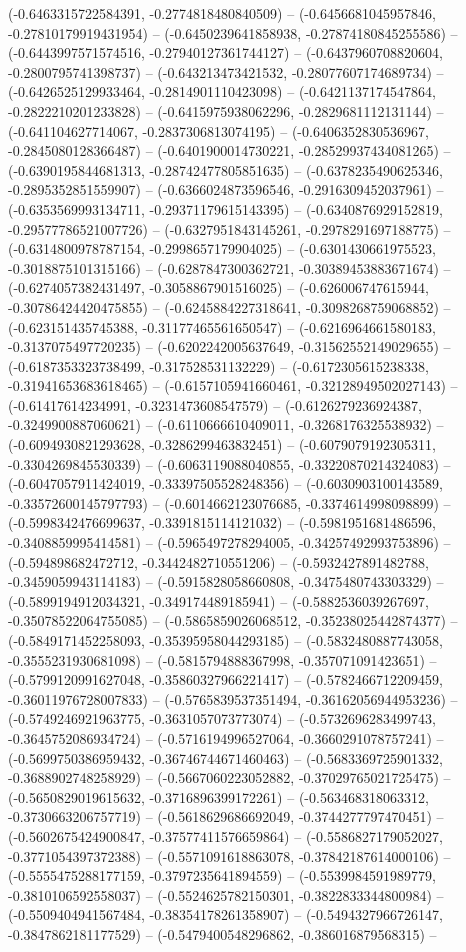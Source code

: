 (-0.6463315722584391, -0.2774818480840509) -- (-0.6456681045957846, -0.27810179919431954) -- (-0.6450239641858938, -0.27874180845255586) -- (-0.6443997571574516, -0.27940127361744127) -- (-0.6437960708820604, -0.2800795741398737) -- (-0.643213473421532, -0.28077607174689734) -- (-0.6426525129933464, -0.2814901110423098) -- (-0.6421137174547864, -0.2822210201233828) -- (-0.6415975938062296, -0.2829681112131144) -- (-0.641104627714067, -0.2837306813074195) -- (-0.6406352830536967, -0.2845080128366487) -- (-0.6401900014730221, -0.28529937434081265) -- (-0.6390195844681313, -0.28742477805851635) -- (-0.6378235490625346, -0.2895352851559907) -- (-0.6366024873596546, -0.2916309452037961) -- (-0.6353569993134711, -0.29371179615143395) -- (-0.6340876929152819, -0.29577786521007726) -- (-0.6327951843145261, -0.2978291697188775) -- (-0.6314800978787154, -0.2998657179904025) -- (-0.6301430661975523, -0.3018875101315166) -- (-0.6287847300362721, -0.30389453883671674) -- (-0.6274057382431497, -0.3058867901516025) -- (-0.626006747615944, -0.30786424420475855) -- (-0.6245884227318641, -0.3098268759068852) -- (-0.623151435745388, -0.31177465561650547) -- (-0.6216964661580183, -0.3137075497720235) -- (-0.6202242005637649, -0.31562552149029655) -- (-0.6187353323738499, -0.317528531132229) -- (-0.6172305615238338, -0.31941653683618465) -- (-0.6157105941660461, -0.32128949502027143) -- (-0.61417614234991, -0.3231473608547579) -- (-0.6126279236924387, -0.3249900887060621) -- (-0.6110666610409011, -0.3268176325538932) -- (-0.6094930821293628, -0.3286299463832451) -- (-0.6079079192305311, -0.3304269845530339) -- (-0.6063119088040855, -0.33220870214324083) -- (-0.6047057911424019, -0.33397505528248356) -- (-0.6030903100143589, -0.33572600145797793) -- (-0.6014662123076685, -0.3374614998098899) -- (-0.5998342476699637, -0.3391815114121032) -- (-0.5981951681486596, -0.3408859995414581) -- (-0.5965497278294005, -0.34257492993753896) -- (-0.594898682472712, -0.3442482710551206) -- (-0.5932427891482788, -0.3459059943114183) -- (-0.5915828058660808, -0.3475480743303329) -- (-0.5899194912034321, -0.349174489185941) -- (-0.5882536039267697, -0.35078522064755085) -- (-0.5865859026068512, -0.35238025442874377) -- (-0.5849171452258093, -0.35395958044293185) -- (-0.5832480887743058, -0.3555231930681098) -- (-0.5815794888367998, -0.357071091423651) -- (-0.5799120991627048, -0.35860327966221417) -- (-0.5782466712209459, -0.36011976728007833) -- (-0.5765839537351494, -0.36162056944953236) -- (-0.5749246921963775, -0.3631057073773074) -- (-0.5732696283499743, -0.3645752086934724) -- (-0.5716194996527064, -0.3660291078757241) -- (-0.5699750386959432, -0.36746744671460463) -- (-0.5683369725901332, -0.3688902748258929) -- (-0.5667060223052882, -0.37029765021725475) -- (-0.5650829019615632, -0.3716896399172261) -- (-0.563468318063312, -0.3730663206757719) -- (-0.5618629686692049, -0.3744277797470451) -- (-0.5602675424900847, -0.37577411576659864) -- (-0.5586827179052027, -0.3771054397372388) -- (-0.5571091618863078, -0.37842187614000106) -- (-0.5555475288177159, -0.3797235641894559) -- (-0.5539984591989779, -0.3810106592558037) -- (-0.5524625782150301, -0.3822833344800984) -- (-0.5509404941567484, -0.38354178261358907) -- (-0.5494327966726147, -0.3847862181177529) -- (-0.5479400548296862, -0.386016879568315) -- 